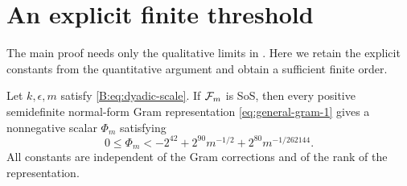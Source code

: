 \section{An explicit finite threshold}\label{app:explicit-bound}

The main proof needs only the qualitative limits in . Here we retain the explicit constants from the quantitative argument and obtain a sufficient finite order.

\begin{theorem}\label{thm:finite-scale}
Let $k,\epsilon,m$ satisfy \eqref{B:eq:dyadic-scale}. If $\mathcal{F}_m$ is SoS,
then every positive semidefinite normal-form Gram representation \eqref{eq:general-gram-1} gives a
nonnegative scalar $\Phi_m$ satisfying
\begin{equation}\label{eq:finite-scale}
          0\le\Phi_m
          <-2^{42}+2^{90}m^{-1/2}+2^{80}m^{-1/262144}.
\end{equation}
All constants are independent of the Gram corrections and of the rank
of the representation.
\end{theorem}
